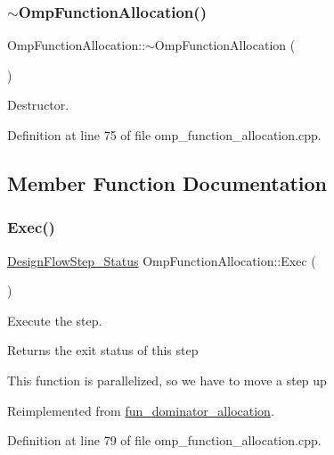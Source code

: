 \subsubsection{\texorpdfstring{$\sim$\+Omp\+Function\+Allocation()}{~OmpFunctionAllocation()}}
{\footnotesize\ttfamily Omp\+Function\+Allocation\+::$\sim$\+Omp\+Function\+Allocation (\begin{DoxyParamCaption}{ }\end{DoxyParamCaption})}



Destructor. 



Definition at line 75 of file omp\+\_\+function\+\_\+allocation.\+cpp.



\subsection{Member Function Documentation}
\mbox{\label{classOmpFunctionAllocation_a5ed037b259e632de3cad930b2b5cc8ef}} 
\subsubsection{\texorpdfstring{Exec()}{Exec()}}
{\footnotesize\ttfamily \hyperlink{design__flow__step_8hpp_afb1f0d73069c26076b8d31dbc8ebecdf}{Design\+Flow\+Step\+\_\+\+Status} Omp\+Function\+Allocation\+::\+Exec (\begin{DoxyParamCaption}{ }\end{DoxyParamCaption})\hspace{0.3cm}{\ttfamily [virtual]}}



Execute the step. 

\begin{DoxyReturn}{Returns}
the exit status of this step 
\end{DoxyReturn}
This function is parallelized, so we have to move a step up 

Reimplemented from \hyperlink{classfun__dominator__allocation_aab3d1e1e5b22f40816fa73325bcab578}{fun\+\_\+dominator\+\_\+allocation}.



Definition at line 79 of file omp\+\_\+function\+\_\+allocation.\+cpp.



